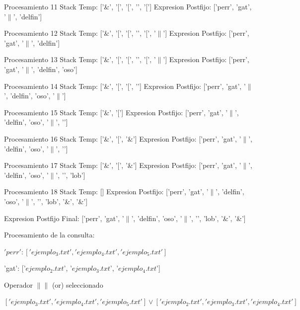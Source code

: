 Procesamiento 11
\newline Stack Temp: ['\&', '[', '[', '\!', '[']
\newline Expresion Postfijo: ['perr', 'gat', '$\|$', 'delfin']


Procesamiento 12
\newline Stack Temp: ['\&', '[', '[', '\!', '[', '$\|$']
\newline Expresion Postfijo: ['perr', 'gat', '$\|$',  'delfin']


Procesamiento 13
\newline Stack Temp: ['\&', '[', '[', '\!', '[', '$\|$']
\newline Expresion Postfijo: ['perr', 'gat', '$\|$', 'delfin', 'oso']


Procesamiento 14
\newline Stack Temp: ['\&', '[', '[', '\!']
\newline Expresion Postfijo: ['perr', 'gat', '$\|$', 'delfin', 'oso', '$\|$']


Procesamiento 15
\newline Stack Temp: ['\&', '[']
\newline Expresion Postfijo: ['perr', 'gat', '$\|$', 'delfin', 'oso', '$\|$', '\!']


Procesamiento 16
\newline Stack Temp: ['\&', '[', '\&']
\newline Expresion Postfijo: ['perr', 'gat', '$\|$', 'delfin', 'oso', '$\|$', '\!']


Procesamiento 17
\newline Stack Temp: ['\&', '[', '\&']
\newline Expresion Postfijo: ['perr', 'gat', '$\|$', 'delfin', 'oso', '$\|$', '\!', 'lob']


Procesamiento 18
\newline Stack Temp: []
\newline Expresion Postfijo: ['perr', 'gat', '$\|$', 'delfin', 'oso', '$\|$', '\!', 'lob', '\&', '\&']

Expresion Postfijo Final: ['perr', 'gat', '$\|$', 'delfin', 'oso', '$\|$', '\!', 'lob', '\&', '\&']

Procesamiento de la consulta:

$'perr': ['ejemplo_3.txt', 'ejemplo_4.txt', 'ejemplo_5.txt']$

'gat': ['$ejemplo_2.txt$', '$ejemplo_3.txt$', '$ejemplo_4.txt$']

Operador $\|\|$ (or) seleccionado

$['ejemplo_3.txt', 'ejemplo_4.txt', 'ejemplo_5.txt'] \lor ['ejemplo_2.txt', 'ejemplo_3.txt', 'ejemplo_4.txt']$


